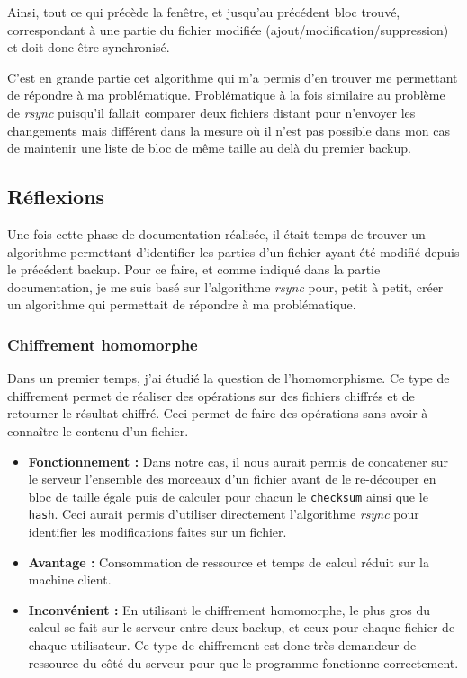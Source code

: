 \documentclass[a4paper,10pt, twoside]{report}
\begin{document}
\begin{spacing}{1.2}
Ainsi, tout ce qui pr\'ec\`ede la fen\^etre, et jusqu'au pr\'ec\'edent bloc
trouv\'e, correspondant \`a une partie du fichier modifi\'ee
(ajout/modification/suppression) et doit donc \^etre synchronis\'e.

C'est en grande partie cet algorithme qui m'a permis d'en trouver me permettant
de r\'epondre \`a ma probl\'ematique. Probl\'ematique \`a la fois similaire au
probl\`eme de \textit{rsync} puisqu'il fallait comparer deux fichiers distant
pour n'envoyer les changements mais diff\'erent dans la mesure o\`u il n'est
pas possible dans mon cas de maintenir une liste de bloc de m\^eme taille au
del\`a du premier backup.

\subsection{R\'eflexions}
Une fois cette phase de documentation r\'ealis\'ee, il \'etait temps de trouver
un algorithme permettant d'identifier les parties d'un fichier ayant \'et\'e
modifi\'e depuis le pr\'ec\'edent backup. Pour ce faire, et comme indiqu\'e
dans la partie documentation, je me suis bas\'e sur l'algorithme \textit{rsync}
pour, petit \`a petit, cr\'eer un algorithme qui permettait de r\'epondre \`a ma
probl\'ematique.

\subsubsection{Chiffrement homomorphe}
Dans un premier temps, j'ai \'etudi\'e la question de l'homomorphisme. Ce type
de chiffrement permet de r\'ealiser des op\'erations sur des fichiers chiffr\'es
et de retourner le r\'esultat chiffr\'e. Ceci permet de faire des op\'erations
sans avoir \`a conna\^itre le contenu d'un fichier.

\begin{itemize}
 \item \textbf{Fonctionnement :} Dans notre cas, il nous aurait permis de
 concatener sur le serveur l'ensemble des morceaux d'un fichier avant de le
 re-d\'ecouper en bloc de taille \'egale puis de calculer pour chacun le
 \texttt{checksum} ainsi que le \texttt{hash}. Ceci aurait permis d'utiliser
 directement l'algorithme \textit{rsync} pour identifier les modifications
 faites sur un fichier.

 \item \textbf{Avantage :} Consommation de ressource et temps de calcul
 r\'eduit sur la machine client.
 
 \item \textbf{Inconv\'enient :} En utilisant le chiffrement homomorphe, le
 plus gros du calcul se fait sur le serveur entre deux backup, et ceux pour
 chaque fichier de chaque utilisateur. Ce type de chiffrement est donc tr\`es
 demandeur de ressource du c\^ot\'e du serveur pour que le programme fonctionne
 correctement.


\end{itemize}
\end{spacing}
\end{document}
